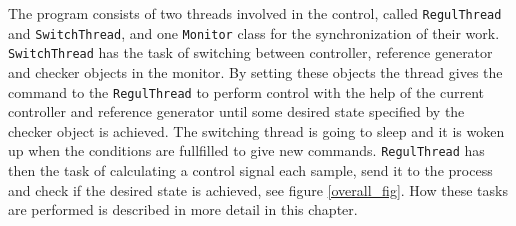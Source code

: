 


The program consists of two threads involved in the control, called \texttt{RegulThread} and \texttt{SwitchThread}, and one \texttt{Monitor} class for the synchronization of their work. 
\texttt{SwitchThread} has the task of switching between controller, reference generator and checker objects in the monitor. By setting these objects the thread gives the command to the \texttt{RegulThread} to perform control with the help of the current controller and reference generator until some desired state specified by the checker object is achieved. The switching thread is going to sleep and it is woken up when the conditions are fullfilled to give new commands.
\texttt{RegulThread} has then the task of calculating a control signal each sample, send it to the process and check if the desired state is achieved, see figure \ref{overall_fig}. How these tasks are performed is described in more detail in this chapter.

